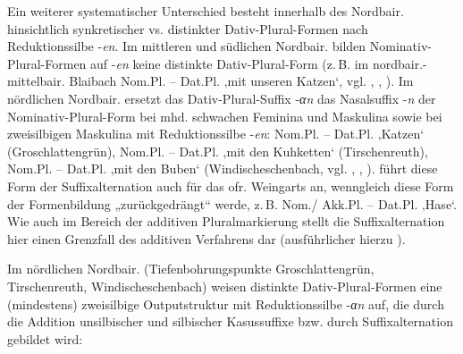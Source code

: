 Ein weiterer systematischer Unterschied besteht innerhalb des Nordbair. hinsichtlich synkretischer vs. distinkter Dativ-Plural-Formen nach Reduktionssilbe -\textit{en}. Im mittleren und südlichen Nordbair. bilden Nominativ-Plural-Formen auf -\textit{en} keine distinkte Dativ-Plural-Form (z.\,B. im nordbair.-mittelbair. Blaibach Nom.Pl.   -- Dat.Pl.    ‚mit unseren Katzen‘, vgl. \citealt[87]{Bachmann2000}, \citealt[§147.2b]{Kollmer1987}, \citealt[140]{Rowley1997}). Im nördlichen Nordbair. ersetzt das Dativ-Plural-Suffix {}-\textit{αn} das Nasalsuffix -\textit{n} der Nominativ-Plural-Form bei mhd. schwachen Feminina und Maskulina sowie bei zweisilbigen Maskulina mit Reduktionssilbe -\textit{en}: Nom.Pl.   -- Dat.Pl.    ‚Katzen‘ (Groschlattengrün), Nom.Pl.  -- Dat.Pl.   ‚mit den Kuhketten‘ (Tirschenreuth), Nom.Pl.  -- Dat.Pl.   ‚mit den Buben‘ (Windischeschenbach, vgl. \citealt[20]{Micko1933}, \citealt[142]{Rowley1997}, \citealt[§574]{Schmeller1821}). \citet[174]{Schnabel2000} führt diese Form der Suffixalternation auch für das ofr. Weingarts an, wenngleich diese Form der Formenbildung „zurückgedrängt“ werde, z.\,B. Nom./
Akk.Pl.  -- Dat.Pl.  ‚Hase‘. Wie auch im Bereich der additiven Pluralmarkierung stellt die Suffixalternation hier einen Grenzfall des additiven Verfahrens dar (ausführlicher hierzu ).

Im nördlichen Nordbair. (Tiefenbohrungspunkte Groschlattengrün, Tirschenreuth, Windischeschenbach) weisen distinkte Dativ-Plural-Formen eine (mindestens) zweisilbige Outputstruktur mit Reduktionssilbe -\textit{αn} auf, die durch die Addition unsilbischer und silbischer Kasussuffixe bzw. durch Suffixalternation gebildet wird:

